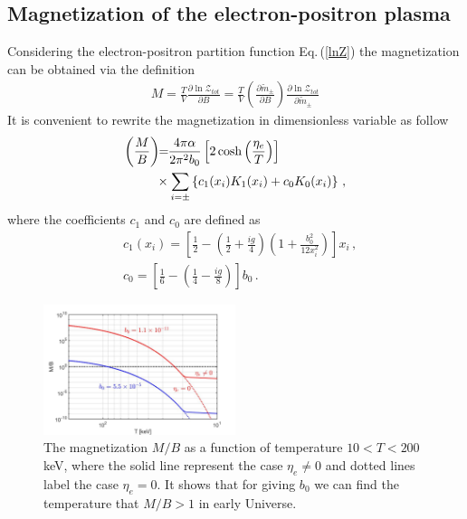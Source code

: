 \documentclass[twocolumn,preprintnumbers,amsmath,amssymb]{revtex4-2}
\newcommand{\req}[1]{Eq.\,({\ref{#1}})}
\begin{document}
\subsection{Magnetization of the electron-positron plasma}\label{sec:Magnetization}
\noindent Considering the electron-positron partition function \req{lnZ} the magnetization can be obtained via the definition
\begin{align}
M=\frac{T}{V}\frac{\partial \ln\mathcal{Z}_{tot}}{\partial B}=\frac{T}{V}\left(\frac{\partial\tilde m_\pm}{\partial B}\right)\frac{\partial \ln\mathcal{Z}_{tot}}{\partial\tilde m_\pm}
\end{align}
It is convenient to rewrite the magnetization in dimensionless variable as follow
\begin{align}\label{Magnetization}
 \left(\frac{M}{B}\right)\!\!&=\!\!\frac{4\pi\alpha}{2\pi^2b_0}\left[2\cosh\left(\frac{\eta_{e}}{T}\right)\right]\notag\\
 &\times\sum_{i=\pm}\left\{c_{1}(x_{i})K_1(x_i)+c_{0}K_0(x_i)\right\}\,,
 \end{align}
 where the coefficients $c_1$ and $c_0$ are defined as
 \begin{align}
&c_{1}(x_{i})=\left[\frac{1}{2}-\left(\frac{1}{2}+\frac{ig}{4}\right)\left(1+\frac{b^2_0}{12x^2_i}\right)\right]x_i\,,\\
&c_{0} = \left[\frac{1}{6}-\left(\frac{1}{4}-\frac{ig}{8}\right)\right]b_0\,.
\end{align}
\begin{figure}[b]
\centering
\includegraphics[width=0.5\textwidth]{./plots/MagnetizationFinal_200keV.jpg}
\caption{The magnetization $M/B$ as a function of temperature $10<T<200$ keV, where the solid line represent the case $\eta_e\neq0$ and dotted lines label the case $\eta_e=0$. It shows that for giving $b_0$ we can find the temperature that $M/B>1$ in early Universe.}
\label{Case2_fig} 
\end{figure}
\end{document}
